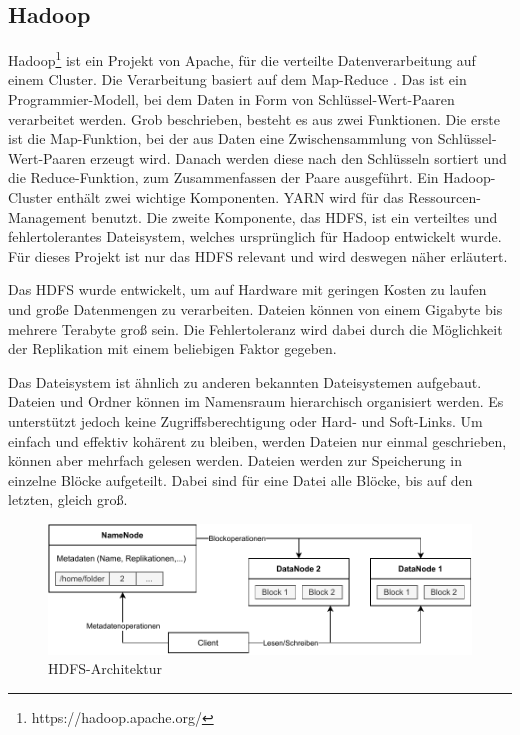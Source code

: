 \subsection{Hadoop}

Hadoop\footnote{https://hadoop.apache.org/} ist ein Projekt von Apache, für die verteilte Datenverarbeitung auf einem Cluster.
Die Verarbeitung basiert auf dem Map-Reduce \parencite{mapred}. 
Das ist ein Programmier-Modell, bei dem Daten in Form von Schlüssel-Wert-Paaren verarbeitet werden.
Grob beschrieben, besteht es aus zwei Funktionen.
Die erste ist die Map-Funktion, bei der aus Daten eine Zwischensammlung von Schlüssel-Wert-Paaren erzeugt wird.
Danach werden diese nach den Schlüsseln sortiert und die Reduce-Funktion, zum Zusammenfassen der Paare ausgeführt.
Ein Hadoop-Cluster enthält zwei wichtige Komponenten.
YARN \parencite{yarn} wird für das Ressourcen-Management benutzt.
Die zweite Komponente, das HDFS, ist ein verteiltes und fehlertolerantes Dateisystem, welches ursprünglich für Hadoop entwickelt wurde.
Für dieses Projekt ist nur das HDFS relevant und wird deswegen näher erläutert.

Das HDFS wurde entwickelt, um auf Hardware mit geringen Kosten zu laufen und große Datenmengen zu verarbeiten.
Dateien können von einem Gigabyte bis mehrere Terabyte groß sein.
Die Fehlertoleranz wird dabei durch die Möglichkeit der Replikation mit einem beliebigen Faktor gegeben.

Das Dateisystem ist ähnlich zu anderen bekannten Dateisystemen aufgebaut.
Dateien und Ordner können im Namensraum hierarchisch organisiert werden.
Es unterstützt jedoch keine Zugriffsberechtigung oder Hard- und Soft-Links.
Um einfach und effektiv kohärent zu bleiben, werden Dateien nur einmal geschrieben, können aber mehrfach gelesen werden.
Dateien werden zur Speicherung in einzelne Blöcke aufgeteilt.
Dabei sind für eine Datei alle Blöcke, bis auf den letzten, gleich groß.

\begin{figure}
    \centering
    \includegraphics[width=\textwidth]{Grafiken/Grundlagen/HDFS.pdf}
    \caption[HDFS-Architektur]{HDFS-Architektur\footnotemark}
    \label{fig:hdfs-cluster}
\end{figure}

